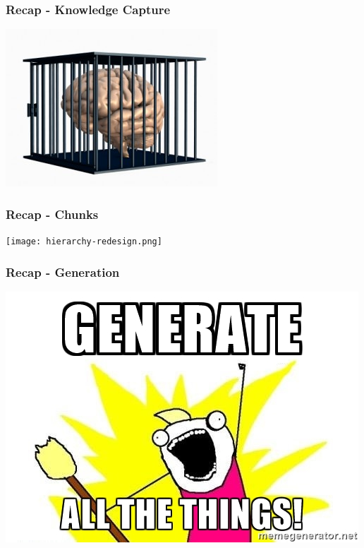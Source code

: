 \documentclass{beamer}
\begin{document}
\begin{frame}

\frametitle{Recap - Knowledge Capture}
\begin{center}
\includegraphics[width=.8\textwidth]{KC.jpg}
\end{center}

\end{frame}


\begin{frame}

\frametitle{Recap - Chunks}

\begin{center}
\texttt{[image: hierarchy-redesign.png]}
\end{center}
\end{frame}


\begin{frame}

\frametitle{Recap - Generation}
\begin{center}
\includegraphics[width=\textwidth]{generate_all_the_things.jpg}
\end{center}

\end{frame}
\end{document}
